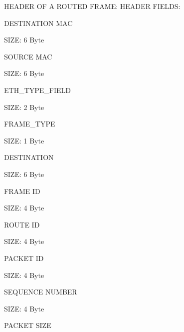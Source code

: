 H\-E\-A\-D\-E\-R O\-F A R\-O\-U\-T\-E\-D F\-R\-A\-M\-E\-: H\-E\-A\-D\-E\-R F\-I\-E\-L\-D\-S\-:
\begin{DoxyItemize}
\item D\-E\-S\-T\-I\-N\-A\-T\-I\-O\-N M\-A\-C
\begin{DoxyItemize}
\item S\-I\-Z\-E\-: 6 Byte
\end{DoxyItemize}
\item S\-O\-U\-R\-C\-E M\-A\-C
\begin{DoxyItemize}
\item S\-I\-Z\-E\-: 6 Byte
\end{DoxyItemize}
\item E\-T\-H\-\_\-\-T\-Y\-P\-E\-\_\-\-F\-I\-E\-L\-D
\begin{DoxyItemize}
\item S\-I\-Z\-E\-: 2 Byte
\end{DoxyItemize}
\item F\-R\-A\-M\-E\-\_\-\-T\-Y\-P\-E
\begin{DoxyItemize}
\item S\-I\-Z\-E\-: 1 Byte
\end{DoxyItemize}
\item D\-E\-S\-T\-I\-N\-A\-T\-I\-O\-N
\begin{DoxyItemize}
\item S\-I\-Z\-E\-: 6 Byte
\end{DoxyItemize}
\item F\-R\-A\-M\-E I\-D
\begin{DoxyItemize}
\item S\-I\-Z\-E\-: 4 Byte
\end{DoxyItemize}
\item R\-O\-U\-T\-E I\-D
\begin{DoxyItemize}
\item S\-I\-Z\-E\-: 4 Byte
\end{DoxyItemize}
\item P\-A\-C\-K\-E\-T I\-D
\begin{DoxyItemize}
\item S\-I\-Z\-E\-: 4 Byte
\end{DoxyItemize}
\item S\-E\-Q\-U\-E\-N\-C\-E N\-U\-M\-B\-E\-R
\begin{DoxyItemize}
\item S\-I\-Z\-E\-: 4 Byte
\end{DoxyItemize}
\item P\-A\-C\-K\-E\-T S\-I\-Z\-E
\begin{DoxyItemize}

\end{DoxyItemize}
\end{DoxyItemize}
